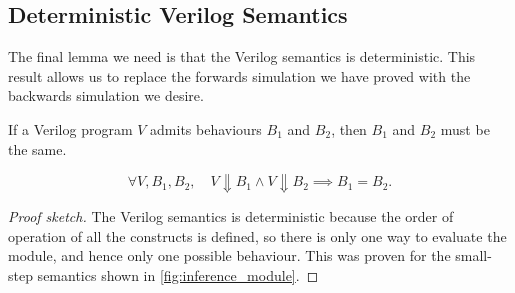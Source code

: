 
\subsection{Deterministic Verilog Semantics}%
\label{sec:proof:deterministic}

The final lemma we need is that the Verilog semantics is deterministic. This
result allows us to replace the forwards simulation we have proved with the
backwards simulation we desire.

\begin{lemma}\label{lemma:deterministic}
  If a Verilog program $V$ admits behaviours $B_1$ and $B_2$, then $B_1$ and
  $B_2$ must be the same.

  \begin{equation*}
    \forall V, B_{1}, B_{2},\quad V \Downarrow B_{1} \land V \Downarrow B_{2} \implies B_{1} = B_{2}.
  \end{equation*}
\end{lemma}

\begin{proof}[Proof sketch]
  The Verilog semantics is deterministic because the order of operation of all
  the constructs is defined, so there is only one way to evaluate the module,
  and hence only one possible behaviour. This was proven for the small-step
  semantics shown in \cref{fig:inference_module}.
\end{proof}

